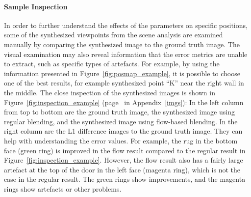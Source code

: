\paragraph{Sample Inspection}
In order to further understand the effects of the parameters on specific positions, some of the synthesized viewpoints from the scene analysis are examined manually by comparing the synthesized image to the ground truth image. The visual examination may also reveal information that the error metrics are unable to extract, such as specific types of artefacts. For example, by using the information presented in Figure~\ref{fig:posmap_example}, it is possible to choose one of the best results, for example synthesized point ``K'' near the right wall in the middle. The close inspection of the synthesized images is shown in Figure~\ref{fig:inspection_example} (page~\pageref{fig:inspection_example} in Appendix~\ref{imgs}\footnotemark): In the left column from top to bottom are the ground truth image, the synthesized image using regular blending, and the synthesized image using flow-based blending. In the right column are the L1 difference images to the ground truth image. They can help with understanding the error values. For example, the rug in the bottom face (green ring) is improved in the flow result compared to the regular result in Figure~\ref{fig:inspection_example}. However, the flow result also has a fairly large artefact at the top of the door in the left face (magenta ring), which is not the case in the regular result. The green rings show improvements, and the magenta rings show artefacts or other problems.















